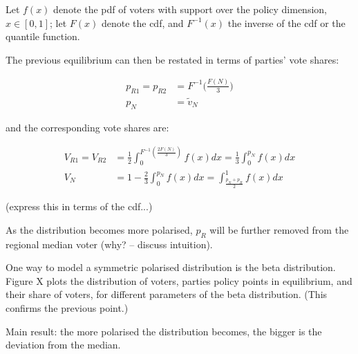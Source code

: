 \documentclass[11pt]{article}
\begin{document}
Let $f(x)$ denote the pdf of voters with support over the policy dimension, $x \in [0, 1]$; let $F(x)$ denote the cdf, and $F^{-1}(x)$ the inverse of the cdf or the quantile function.

The previous equilibrium can then be restated in terms of parties' vote shares:

\begin{align*}
    p_{R1} = p_{R2} & = F^{-1}\Big(\frac{F(N)}{3}\Big) \\
    p_N & = \tilde{v}_N
\end{align*}

and the corresponding vote shares are:

\begin{align*}
    V_{R1} = V_{R2} & = \frac{1}{2} \int_{0}^{F^{-1}(\frac{2 F(N)}{3})} f(x) dx = \frac{1}{3} \int_{0}^{p_N} f(x) dx \\
    V_N & = 1 - \frac{2}{3} \int_{0}^{p_N} f(x) dx = \int_{\frac{p_N + p_R}{2}}^{1} f(x) dx
\end{align*}

(express this in terms of the cdf...)

As the distribution becomes more polarised, $p_R$ will be further removed from the regional median voter (why? -- discuss intuition).

One way to model a symmetric polarised distribution is the beta distribution. Figure X plots the distribution of voters, parties policy points in equilibrium, and their share of voters, for different parameters of the beta distribution. (This confirms the previous point.)






Main result: the more polarised the distribution becomes, the bigger is the deviation from the median.
\end{document}

